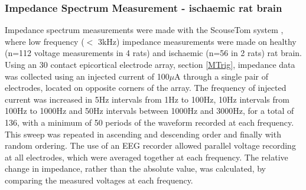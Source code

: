 \subsubsection{Impedance Spectrum Measurement - ischaemic rat brain}

Impedance spectrum measurements were made with the ScouseTom system \cite{Dowrick_2015}, where low frequency ($<$ 3kHz) impedance measurements were made on healthy (n=112 voltage measurements in 4 rats) and ischaemic (n=56 in 2 rats) rat brain. Using an 30 contact epicortical electrode array, section \ref{MTrig}, impedance data was collected using an injected current of 100$\mu$A through a single pair of electrodes, located on opposite corners of the array. The frequency of injected current was increased in 5Hz intervals from 1Hz to 100Hz, 10Hz intervals from 100Hz to 1000Hz and 50Hz intervals between 1000Hz and 3000Hz, for a total of 136, with a minimum of 50 periods of the waveform recorded at each frequency. This sweep was repeated in ascending and descending order and finally with random ordering. The use of an EEG recorder allowed parallel voltage recording at all electrodes, which were averaged together at each frequency. The relative change in impedance, rather than the absolute value, was calculated, by comparing the measured voltages at each frequency.